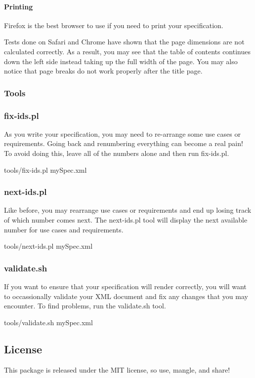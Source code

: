 \paragraph*{Printing}

Firefox is the best browser to use if you need to print your specification.

Tests done on Safari and Chrome have shown that the page dimensions are not calculated correctly. As a result, you may see that the table of contents continues down the left side instead taking up the full width of the page. You may also notice that page breaks do not work properly after the title page.

\subsubsection*{Tools}

\subsubsection*{{\ttfamily fix-\/ids.\+pl}}

As you write your specification, you may need to re-\/arrange some use cases or requirements. Going back and renumbering everything can become a real pain! To avoid doing this, leave all of the numbers alone and then run {\ttfamily fix-\/ids.\+pl}. \begin{DoxyVerb}tools/fix-ids.pl mySpec.xml
\end{DoxyVerb}


\subsubsection*{{\ttfamily next-\/ids.\+pl}}

Like before, you may rearrange use cases or requirements and end up losing track of which number comes next. The {\ttfamily next-\/ids.\+pl} tool will display the next available number for use cases and requirements. \begin{DoxyVerb}tools/next-ids.pl mySpec.xml
\end{DoxyVerb}


\subsubsection*{{\ttfamily validate.\+sh}}

If you want to ensure that your specification will render correctly, you will want to occassionally validate your X\+ML document and fix any changes that you may encounter. To find problems, run the {\ttfamily validate.\+sh} tool. \begin{DoxyVerb}tools/validate.sh mySpec.xml
\end{DoxyVerb}


\subsection*{License }

This package is released under the M\+IT license, so use, mangle, and share! 